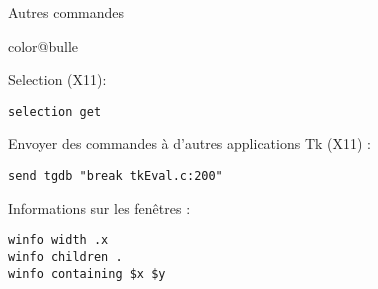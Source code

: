 \documentclass[a4paper,landscape,smooth]{show}
\begin{document}

\begin{tslide}{Autres commandes}
   \vfill
   \begin{bitemize}{color@bulle}
      \item Selection (X11): 

	 {\tt selection get}

      \item Envoyer des commandes à d'autres applications Tk (X11) :

	 {\tt send tgdb "break tkEval.c:200" }

      \item Informations sur les fenêtres :

	 {\tt winfo width .x\\
	       winfo children .\\
	       winfo containing \$x \$y}
   \end{bitemize}
   \vfill
\end{tslide}


\vfill\eject\null\vfill\eject
\end{document}
